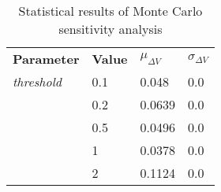 
                \begin{table}[]
                \centering
                \begin{tabular}{l l l l}
                \rowcolor[HTML]{EFEFEF} \textbf{Parameter} & \textbf{Value} & \textbf{$\mu_{\Delta V}$} & \textbf{$\sigma_{\Delta V}$} \\
                \textit{threshold} & 0.1 & 0.048 & 0.0 \\
 & 0.2 & 0.0639 & 0.0 \\
 & 0.5 & 0.0496 & 0.0 \\
 & 1 & 0.0378 & 0.0 \\
 & 2 & 0.1124 & 0.0 \\

                \end{tabular}
                \caption{Statistical results of Monte Carlo sensitivity analysis}
                \label{tab:SensitivityAnalysis}
                \end{table}
                